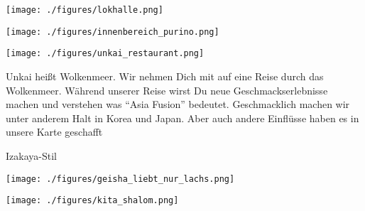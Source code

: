 \documentclass[landscape, a4paper]{article}
\begin{document}
\newpage
\begin{minipage}[t]{0.32\textwidth}
	\vspace{0cm}
	\setlength{\parskip}{0.25cm}

	\texttt{[image: ./figures/lokhalle.png]}
	\setlength{\parskip}{0.25cm}

	\texttt{[image: ./figures/innenbereich\_purino.png]}
	\setlength{\parskip}{0.25cm}
\end{minipage}
\hspace{0.4cm}
\begin{minipage}[t]{0.32\textwidth}
	\vspace{0cm}
	\setlength{\parskip}{0.25cm}

	\texttt{[image: ./figures/unkai\_restaurant.png]}
	\setlength{\parskip}{0.25cm}

	Unkai heißt Wolkenmeer. Wir nehmen Dich mit auf eine Reise durch das Wolkenmeer. Während unserer Reise wirst Du neue Geschmackserlebnisse machen und verstehen was “Asia Fusion” bedeutet. Geschmacklich machen wir unter anderem Halt in Korea und Japan. Aber auch andere Einflüsse haben es in unsere Karte geschafft

	Izakaya-Stil

	\texttt{[image: ./figures/geisha\_liebt\_nur\_lachs.png]}
	\setlength{\parskip}{0.25cm}
	\vspace{0.15cm}
\end{minipage}
\hspace{0.4cm}
\begin{minipage}[t]{0.32\textwidth}
	\vspace{0cm}
	\setlength{\parskip}{0.25cm}

	\texttt{[image: ./figures/kita\_shalom.png]}
	\setlength{\parskip}{0.25cm}
\end{minipage}
\end{document}
